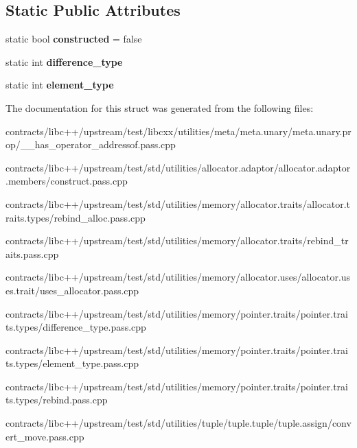 \subsection*{Static Public Attributes}
\begin{DoxyCompactItemize}
\item 
\mbox{\label{struct_e_a19af874545a7dcbc1f4db51785e57b38}} 
static bool {\bfseries constructed} = false
\item 
\mbox{\label{struct_e_a96b364cb607fe347e5f00ef35465148a}} 
static int {\bfseries difference\+\_\+type}
\item 
\mbox{\label{struct_e_a28cdc026026cc6f1988a0b03f2d4887c}} 
static int {\bfseries element\+\_\+type}
\end{DoxyCompactItemize}


The documentation for this struct was generated from the following files\+:\begin{DoxyCompactItemize}
\item 
contracts/libc++/upstream/test/libcxx/utilities/meta/meta.\+unary/meta.\+unary.\+prop/\+\_\+\+\_\+has\+\_\+operator\+\_\+addressof.\+pass.\+cpp\item 
contracts/libc++/upstream/test/std/utilities/allocator.\+adaptor/allocator.\+adaptor.\+members/construct.\+pass.\+cpp\item 
contracts/libc++/upstream/test/std/utilities/memory/allocator.\+traits/allocator.\+traits.\+types/rebind\+\_\+alloc.\+pass.\+cpp\item 
contracts/libc++/upstream/test/std/utilities/memory/allocator.\+traits/rebind\+\_\+traits.\+pass.\+cpp\item 
contracts/libc++/upstream/test/std/utilities/memory/allocator.\+uses/allocator.\+uses.\+trait/uses\+\_\+allocator.\+pass.\+cpp\item 
contracts/libc++/upstream/test/std/utilities/memory/pointer.\+traits/pointer.\+traits.\+types/difference\+\_\+type.\+pass.\+cpp\item 
contracts/libc++/upstream/test/std/utilities/memory/pointer.\+traits/pointer.\+traits.\+types/element\+\_\+type.\+pass.\+cpp\item 
contracts/libc++/upstream/test/std/utilities/memory/pointer.\+traits/pointer.\+traits.\+types/rebind.\+pass.\+cpp\item 
contracts/libc++/upstream/test/std/utilities/tuple/tuple.\+tuple/tuple.\+assign/convert\+\_\+move.\+pass.\+cpp\end{DoxyCompactItemize}
